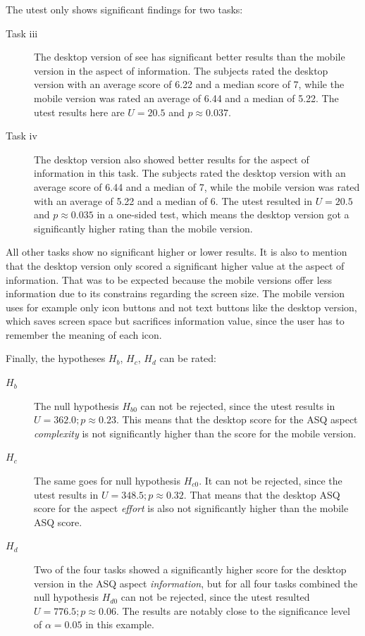 The \gls{utest} only shows significant findings for two tasks:
\begin{description}
  \item[Task iii] The desktop version of \gls{see} has significant better results than the mobile version in the aspect of information. 
  The subjects rated the desktop version with an average score of 6.22 and a median score of 7, while the mobile version was rated an average of 6.44 and a median of 5.22.
  The \gls{utest} results here are $U = 20.5$ and $p \approx 0.037$.
  \item[Task iv]  The desktop version also showed better results for the aspect of information in this task. 
  The subjects rated the desktop version with an average score of 6.44 and a median of 7, while the mobile version was rated with an average of 5.22 and a median of 6. 
  The \gls{utest} resulted in $U=20.5$ and $p \approx 0.035$ in a one-sided test, which means the desktop version got a significantly higher rating than the mobile version.
\end{description}

All other tasks show no significant higher or lower results. 
It is also to mention that the desktop version only scored a significant higher value at the aspect of information.
That was to be expected because the mobile versions offer less information due to its constrains regarding the screen size. 
The mobile version uses for example only icon buttons and not text buttons like the desktop version, which saves screen space but sacrifices information value, since the user has to remember the meaning of each icon.

Finally, the hypotheses $H_b$, $H_c$, $H_d$ can be rated:

\begin{description}
  \item[$H_b$] The null hypothesis $H_{b0}$ can not be rejected, since the \gls{utest} results in $U = 362.0; p \approx 0.23$. 
  This means that the desktop score for the \gls{ASQ} aspect \textit{complexity} is not significantly higher than the score for the mobile version. 
  \item[$H_c$] The same goes for null hypothesis $H_{c0}$. 
  It can not be rejected, since the \gls{utest} results in $U = 348.5; p \approx 0.32$.
  That means that the desktop \gls{ASQ} score for the aspect \textit{effort} is also not significantly higher than the mobile \gls{ASQ} score.
  \item[$H_d$]  Two of the four tasks showed a significantly higher score for the desktop version in the \gls{ASQ} aspect \textit{information}, but for all four tasks combined the null hypothesis $H_{d0}$ can not be rejected, since the \gls{utest} resulted $U = 776.5; p \approx 0.06$.
  The results are notably close to the significance level of $\alpha = 0.05$ in this example.
 \end{description}

